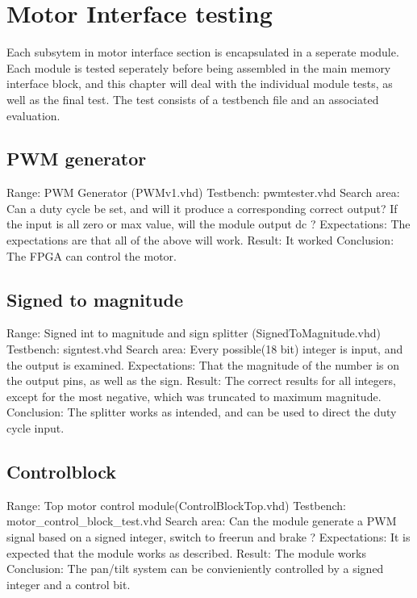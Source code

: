 \chapter{Motor Interface testing}
Each subsytem in motor interface section is encapsulated in a seperate module.
Each module is tested seperately before being assembled in the main memory interface block, and this chapter will deal with the individual module tests, as well as the final test.
The test consists of a testbench file and an associated evaluation.

\section{PWM generator}
Range:                  PWM Generator (PWMv1.vhd)
Testbench: 				pwmtester.vhd
Search area:            Can a duty cycle be set, and will it produce a corresponding correct output?
						If the input is all zero or max value, will the module output dc ?
Expectations:           The expectations are that all of the above will work.
Result:                 It worked
Conclusion:             The FPGA can control the motor. 

\section{Signed to magnitude}
Range:                  Signed int to magnitude and sign splitter (SignedToMagnitude.vhd)
Testbench: 				signtest.vhd
Search area:            Every possible(18 bit) integer is input, and the output is examined.
Expectations:           That the magnitude of the number is on the output pins, as well as the sign.
Result:                 The correct results for all integers, except for the most negative, which was truncated to maximum magnitude.
Conclusion:             The splitter works as intended, and can be used to direct the duty cycle input. 

\section{Controlblock}
Range:                  Top motor control module(ControlBlockTop.vhd)
Testbench: 				motor\_control\_block\_test.vhd
Search area:            Can the module generate a PWM signal based on a signed integer, switch to freerun and brake ?
Expectations:           It is expected that the module works as described.
Result:                 The module works
Conclusion:             The pan/tilt system can be convieniently controlled by a signed integer and a control bit.

